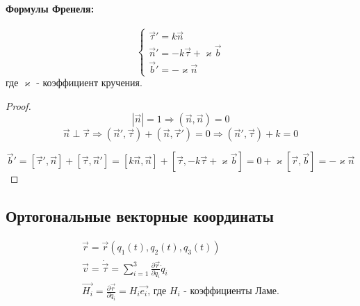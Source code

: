 \documentclass{article}
\begin{document}
  \paragraph{Формулы Френеля:}
  $$ 
  \begin{cases}
  \vec{\tau}' = k \vec{n} \\
  \vec{n}' = - k\vec{\tau} + \varkappa \vec{b} \\
  \vec{b}' = -\varkappa\vec{n}
  \end{cases}
  $$
  где $\varkappa$ - коэффициент кручения.
  
  \begin{proof}
  $$ | \vec{n} | = 1 \Rightarrow (\vec{n}, \vec{n}) = 0 $$
  $$ \vec{n} \perp \vec{\tau} \Rightarrow (\vec{n}', \vec{\tau}) + (\vec{n}, \vec{\tau}') = 0 \Rightarrow (\vec{n}', \vec{\tau}) + k = 0 $$
  
  $$ \vec{b}' = [\vec{ \tau}', \vec{n}] + [\vec{\tau}, \vec{n}'] = [k\vec{n}, \vec{n}] + [\vec{\tau}, -k\vec{\tau} + \varkappa \vec{b}] = 0 + \varkappa[\vec{r}, \vec{b}] = -\varkappa\vec{n} $$
  \end{proof}
  \subsection{Ортогональные векторные координаты}
  
  \begin{gather}
  \vec{r} = \vec{r}(q_1(t), q_2(t), q_3(t)) \\
  \vec{v} = \dot{\vec {\tau}}= \sum \limits_{i = 1}^3 \frac{\partial\vec{r}}{\partial q_i} \dot q_i\\
  \vec{H_i} = \frac{\partial\vec{r}}{\partial q_i} = H_i \vec{e_i} \text{, где $H_i$ - коэффициенты Ламе.} \\ 
  \end{gather}
\end{document}
